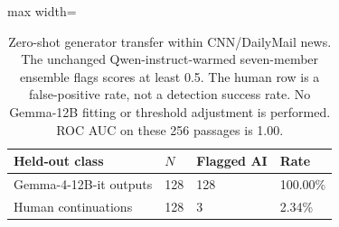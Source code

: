 \begin{table}[ht]\centering\small
\begin{adjustbox}{max width=\linewidth}
\begin{tabular}{llll}\toprule
Held-out class & $N$ & Flagged AI & Rate\\\midrule
Gemma-4-12B-it outputs & 128 & 128 & 100.00\%\\
Human continuations & 128 & 3 & 2.34\%\\
\bottomrule\end{tabular}\end{adjustbox}
\caption{Zero-shot generator transfer within CNN/DailyMail news. The unchanged Qwen-instruct-warmed seven-member ensemble flags scores at least 0.5. The human row is a false-positive rate, not a detection success rate. No Gemma-12B fitting or threshold adjustment is performed. ROC AUC on these 256 passages is 1.00.}\label{tab:generator_transfer}\end{table}
